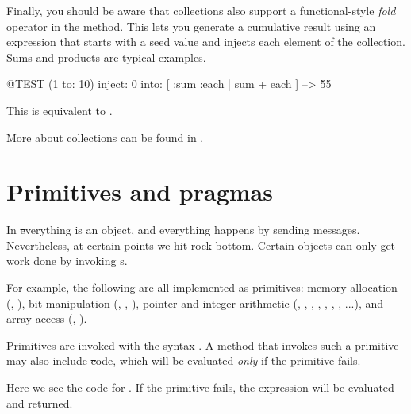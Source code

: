 \documentclass[a4paper,10pt,twoside]{book}
\begin{document}

Finally, you should be aware that collections also support a functional-style \emph{fold} operator in the  method.
This lets you generate a cumulative result using an expression that starts with a seed value and injects each element of the collection.
Sums and products are typical examples.

\begin{code}{@TEST}
(1 to: 10) inject: 0 into: [ :sum :each | sum + each ] --> 55
\end{code}

\noindent
This is equivalent to .

More about collections can be found in  .

\section{Primitives and pragmas}

In \st everything is an object, and everything happens by sending messages.
Nevertheless, at certain points we hit rock bottom.
Certain objects can only get work done by invoking  s.

For example, the following are all implemented as primitives:
memory allocation (, ),
bit manipulation (, , ),
pointer and integer arithmetic (\ct{+}, \ct{-},  \ct{<},  \ct{>}, \ct{*}, \ct{/ }, \ct{=}, \ct{==}...),
and array access (, ).

Primitives are invoked with the syntax .
A method that invokes such a primitive may also include \st code, which will be evaluated \emph{only} if the primitive fails.

Here we see the code for .
If the primitive fails, the expression  will be evaluated and returned.
\end{document}
